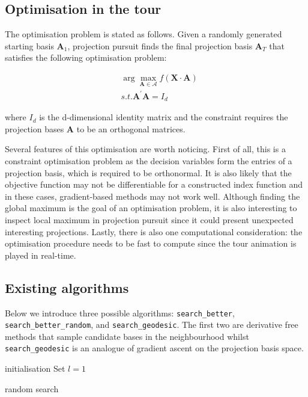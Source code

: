 \documentclass[12pt]{article}
\begin{document}
\hypertarget{tour-optim}{%
\subsection{Optimisation in the tour}\label{tour-optim}}

The optimisation problem is stated as follows. Given a randomly generated starting basis \(\mathbf{A}_1\), projection pursuit finds the final projection basis \(\mathbf{A}_T\) that satisfies the following optimisation problem:

\begin{align}
&\arg \max_{\mathbf{A} \in \mathcal{A}} f(\mathbf{X} \cdot \mathbf{A}) \\
&s.t.  \mathbf{A}^{\prime} \mathbf{A} = I_d
\end{align}

where \(I_d\) is the d-dimensional identity matrix and the constraint requires the projection bases \(\mathbf{A}\) to be an orthogonal matrices.

Several features of this optimisation are worth noticing. First of all, this is a constraint optimisation problem as the decision variables form the entries of a projection basis, which is required to be orthonormal. It is also likely that the objective function may not be differentiable for a constructed index function and in these cases, gradient-based methods may not work well. Although finding the global maximum is the goal of an optimisation problem, it is also interesting to inspect local maximum in projection pursuit since it could present unexpected interesting projections. Lastly, there is also one computational consideration: the optimisation procedure needs to be fast to compute since the tour animation is played in real-time.

\hypertarget{existing-algorithms}{%
\subsection{Existing algorithms}\label{existing-algorithms}}

Below we introduce three possible algorithms: \texttt{search\_better}, \texttt{search\_better\_random}, and \texttt{search\_geodesic}. The first two are derivative free methods that sample candidate bases in the neighbourhood whilst \texttt{search\_geodesic} is an analogue of gradient ascent on the projection basis space.

\begin{algorithm}
\SetAlgoLined
  initialisation\;
  Set $l = 1$\;
  \caption{random search}
  \label{random-search}
\end{algorithm}
\end{document}
